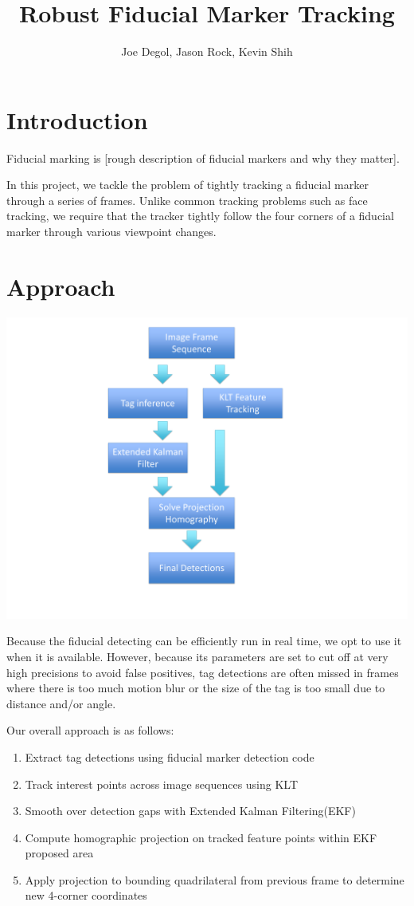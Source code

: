 \documentclass[12pt]{article}
\title{Robust Fiducial Marker Tracking}
\author{Joe Degol, Jason Rock, Kevin Shih}
\begin{document}
\maketitle

\section{Introduction}
Fiducial marking is [rough description of fiducial markers and why they matter].

In this project, we tackle the problem of tightly tracking a fiducial marker through a series of frames. Unlike common tracking problems such as face tracking, we require that the tracker tightly follow the four corners of a fiducial marker through various viewpoint changes. 

\section{Approach}
\includegraphics[scale=.3]{flowchart.pdf}


Because the fiducial detecting can be efficiently run in real time, we opt to use it when it is available. However, because its parameters are set to cut off at very high precisions to avoid false positives, tag detections are often missed in frames where there is too much motion blur or the size of the tag is too small due to distance and/or angle.

Our overall approach is as follows:
\begin{enumerate}
\item Extract tag detections using fiducial marker detection code
\item Track interest points across image sequences using KLT
\item Smooth over detection gaps with Extended Kalman Filtering(EKF)
\item Compute homographic projection on tracked feature points within EKF proposed area
\item Apply projection to bounding quadrilateral from previous frame to determine new 4-corner coordinates
\end{enumerate}
\end{document}
